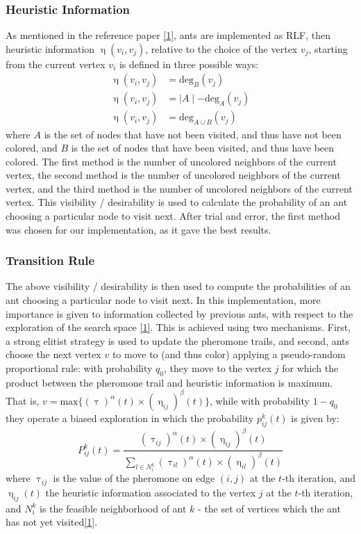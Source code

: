\documentclass{article}
\theoremstyle{mytheoremstyle}
\theoremstyle{mytheoremstyle}
\theoremstyle{myproblemstyle}
\begin{document}
\subsubsection{Heuristic Information}

As mentioned in the reference paper \hyperlink{refpaper}{[1]}, ants are implemented as RLF, then heuristic information $ \upeta(v_i, v_j) $, relative to the choice of the vertex $v_j$, starting from the current vertex $ v_i $ is defined in three possible ways:
\begin{align}
    \upeta(v_i, v_j) & = \text{deg}_B(v_j)               \\
    \upeta(v_i, v_j) & = \mid A \mid - \text{deg}_A(v_j) \\
    \upeta(v_i, v_j) & = \text{deg}_{A \cup B}(v_j)
\end{align}
where $A$ is the set of nodes that have not been visited, and thus have not been colored, and $B$ is the set of nodes that have been visited, and thus have been colored. The first method is the number of uncolored neighbors of the current vertex, the second method is the number of uncolored neighbors of the current vertex, and the third method is the number of uncolored neighbors of the current vertex. This visibility / desirability is used to calculate the probability of an ant choosing a particular node to visit next. After trial and error, the first method was chosen for our implementation, as it gave the best results.

\subsubsection{Transition Rule}

The above visibility / desirability is then used to compute the probabilities of an ant choosing a particular node to visit next. In this implementation, more importance is given to information collected by previous ants, with respect to the exploration of the search space \hyperlink{refpaper}{[1]}. This is achieved using two mechanisms. First, a strong elitist strategy is used to update the pheromone trails, and second, ants choose the next vertex $v$ to move to (and thus color) applying a pseudo-random proportional rule: with probability $ q_0 $, they move to the vertex $j$ for which the product between the pheromone trail and heuristic information is maximum. That is, $ v = \text{max}\{ (\uptau)^\alpha(t) \times (\upeta_{ij})^\beta (t) \} $, while with probability $ 1 - q_0 $ they operate a biased exploration in which the probability $ p_{ij}^k(t) $ is given by:
\[
    P_{ij}^k (t) = \displaystyle\frac{(\uptau_{ij})^\alpha(t) \times (\upeta_{ij})^\beta(t)}{\displaystyle\sum_{l \in N_i^k}(\uptau_{il})^\alpha (t) \times (\upeta_{il})^\beta (t)}
\]
where $ \uptau_{ij} $ is the value of the pheromone on edge $(i, j)$ at the $t$-th iteration, and $ \upeta_{ij}(t) $ the heuristic information associated to the vertex $j$ at the $t$-th iteration, and $ N_i^k $ is the feasible neighborhood of ant $k$ - the set of vertices which the ant has not yet visited\hyperlink{refpaper}{[1]}.
\end{document}
